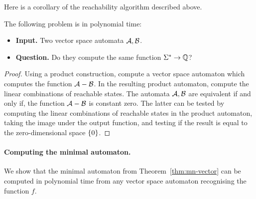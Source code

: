 Here is a corollary of the reachability algorithm described above. 
\begin{theorem}\label{thm:decidable-equivalence-weighted}
	The following problem is in polynomial time:
	\begin{itemize}
		\item {\bf Input.} Two vector space automata $\mathcal{A},\mathcal{B}$.
		\item {\bf Question.} Do they compute the same function $\Sigma^* \to \mathbb Q$?
	\end{itemize}
\end{theorem}
\begin{proof} Using a product construction, compute a vector space automaton which computes the function $\mathcal{A} - \mathcal{B}$.  In the resulting  product automaton,  compute the linear combinations of reachable states. The automata $\mathcal{A},\mathcal{B}$ are equivalent if and only if, the function $\mathcal{A} - \mathcal{B}$ is constant zero. The latter can be tested by computing the linear combinations of reachable states in the product automaton, taking the image under the output function, and testing if the result is equal to the zero-dimensional space $\{0\}$. 
\end{proof}





\paragraph*{Computing the minimal automaton.} We  show that the minimal automaton from Theorem~\ref{thm:mn-vector} can be computed in polynomial time from any vector space automaton recognising the function $f$.

